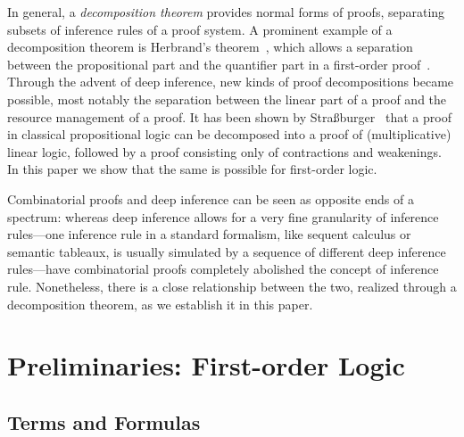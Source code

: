 \documentclass[conference,twosided,10pt]{IEEEtran}
\theoremstyle{definition}
\begin{document}
In general, a \emph{decomposition theorem} provides normal forms of
proofs, separating subsets of inference rules of a proof system. A
prominent example of a decomposition theorem is Herbrand's
theorem~\cite{herbrand:phd}, which allows a separation between the
propositional part and the quantifier part in a first-order
proof~\cite{gentzen:35:II,brunnler:06:herbrand}. Through the advent of
deep inference, new kinds of proof decompositions became possible,
most notably the separation between the linear part of a proof and the
resource management of a proof. It has been shown by
Stra{\ss}burger~\cite{str:07:RTA} that a proof in classical
propositional logic can be decomposed into a proof of (multiplicative)
linear logic, followed by a proof consisting only of contractions and
weakenings. In this paper we show that the same is possible for
first-order logic.

Combinatorial proofs and deep inference can be seen as opposite ends
of a spectrum: whereas deep inference allows for a very fine
granularity of inference rules---one inference rule in a standard
formalism, like sequent calculus or semantic tableaux, is usually
simulated by a sequence of different deep inference rules---have
combinatorial proofs completely abolished the concept of inference
rule. Nonetheless, there is a close relationship between the two,
realized through a decomposition theorem, as we establish it in this
paper.





\section{Preliminaries: First-order Logic}\label{sec:fologic}

\subsection{Terms and Formulas}
\end{document}
